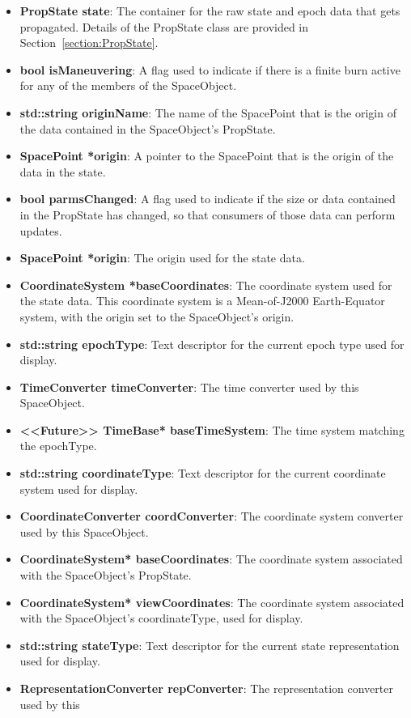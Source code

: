 \begin{itemize}
\item \textbf{PropState state}: The container for the raw state and epoch data that gets
propagated.  Details of the PropState class are provided in Section~\ref{section:PropState}.
\item \textbf{bool isManeuvering}: A flag used to indicate if there is a finite burn active for any
of the members of the SpaceObject.
\item \textbf{std::string originName}: The name of the SpacePoint that is the origin of the data
contained in the SpaceObject's PropState.
\item \textbf{SpacePoint *origin}: A pointer to the SpacePoint that is the origin of the data in
the state.
\item \textbf{bool parmsChanged}: A flag used to indicate if the size or data contained in the
PropState has changed, so that consumers of those data can perform updates.
\item \textbf{SpacePoint *origin}: The origin used for the state data.
\item \textbf{CoordinateSystem *baseCoordinates}: The coordinate system used for the state data.
This coordinate system is a Mean-of-J2000 Earth-Equator system, with the origin set to the
SpaceObject's origin.
\item \textbf{std::string epochType}:  Text descriptor for the current epoch type used for display.
\item \textbf{TimeConverter timeConverter}:  The time converter used by this SpaceObject.
\item \textbf{<<Future>> TimeBase* baseTimeSystem}: The time system matching the epochType.
\item \textbf{std::string coordinateType}: Text descriptor for the current coordinate system used
for display.
\item \textbf{CoordinateConverter coordConverter}:  The coordinate system converter used by this
SpaceObject.
\item \textbf{CoordinateSystem* baseCoordinates}: The coordinate system associated with the
SpaceObject's PropState.
\item \textbf{CoordinateSystem* viewCoordinates}: The coordinate system associated with the
SpaceObject's coordinateType, used for display.
\item \textbf{std::string stateType}: Text descriptor for the current state representation used for
display.
\item \textbf{RepresentationConverter repConverter}:  The representation converter used by this

\end{itemize}
